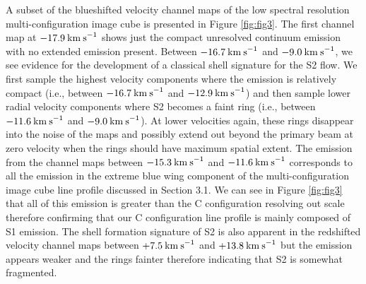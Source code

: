 \documentclass[iop]{emulateapj}
\begin{document}
A subset of the blueshifted velocity channel maps of the low spectral resolution multi-configuration image cube is presented in Figure \ref{fig:fig3}. The first channel map at $-17.9\>{\rm km\>s}^{-1}$ shows just the compact unresolved continuum emission with no extended emission present. Between $-16.7\>{\rm km\>s}^{-1}$ and $-9.0\>{\rm km\>s}^{-1}$, we see evidence for the development of a classical shell signature for the S2 flow. We first sample the highest velocity components where the emission is relatively compact (i.e., between $-16.7\>{\rm km\>s}^{-1}$ and $-12.9\>{\rm km\>s}^{-1}$) and then sample lower radial velocity components where S2 becomes a faint ring (i.e., between $-11.6\>{\rm km\>s}^{-1}$ and $-9.0\>{\rm km\>s}^{-1}$). At lower velocities again, these rings disappear into the noise of the maps and possibly extend out beyond the primary beam at zero velocity when the rings should have maximum spatial extent. The emission from the channel maps between $-15.3\>{\rm km\>s}^{-1}$ and $-11.6\>{\rm km\>s}^{-1}$ corresponds to all the emission in the extreme blue wing component of the multi-configuration image cube line profile discussed in Section 3.1. We can see in Figure \ref{fig:fig3} that all of this emission is greater than the C configuration resolving out scale therefore confirming that our C configuration line profile is mainly composed of S1 emission. The shell formation signature of S2 is also apparent in the redshifted velocity channel maps between $+7.5\>{\rm km\>s}^{-1}$ and $+13.8\>{\rm km\>s}^{-1}$ but the emission appears weaker and the rings fainter therefore indicating that S2 is somewhat fragmented. 
\end{document}
